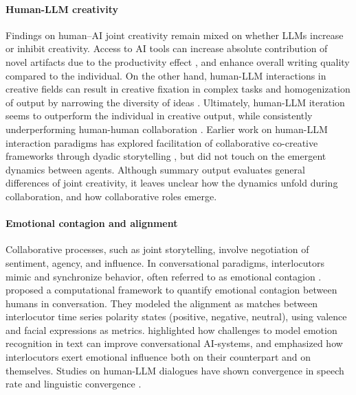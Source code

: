 \documentclass[11pt]{article}
\begin{document}
\paragraph{Human-LLM creativity}
Findings on human--AI joint creativity remain mixed on whether LLMs increase or inhibit creativity. Access to AI tools can increase absolute contribution of novel artifacts due to the productivity effect \cite{zhou2025expands}, and enhance overall writing quality \cite{noy2023experimental} compared to the individual. On the other hand, human-LLM interactions in creative fields can result in creative fixation in complex tasks \cite{cheng2025inspiration} and homogenization of output by narrowing the diversity of ideas \cite{anderson2024homogenization}. Ultimately, human-LLM iteration seems to outperform the individual in creative output, while consistently underperforming human-human collaboration \cite{tang2025best}. Earlier work on human-LLM interaction paradigms has explored facilitation of collaborative co-creative frameworks through dyadic storytelling \cite{roemmele2015creative, clark2021choose}, but did not touch on the emergent dynamics between agents. Although summary output evaluates general differences of joint creativity, it leaves unclear how the dynamics unfold during collaboration, and how collaborative roles emerge. 

\paragraph{Emotional contagion and alignment}
Collaborative processes, such as joint storytelling, involve negotiation of sentiment, agency, and influence. In conversational paradigms, interlocutors mimic and synchronize behavior, often referred to as emotional contagion \cite{hatfield1993emotional}. \citet{varni2017computational} proposed a computational framework to quantify emotional contagion between humans in conversation. They modeled the alignment as matches between interlocutor time series polarity states (positive, negative, neutral), using valence and facial expressions as metrics. \citet{poria2019emotion} highlighted how challenges to model emotion recognition in text can improve conversational AI-systems, and emphasized how interlocutors exert emotional influence both on their counterpart and on themselves. Studies on human-LLM dialogues have shown convergence in speech rate \cite{li2025ai} and linguistic convergence \cite{wilkenfeld2022ai}.  
\end{document}
